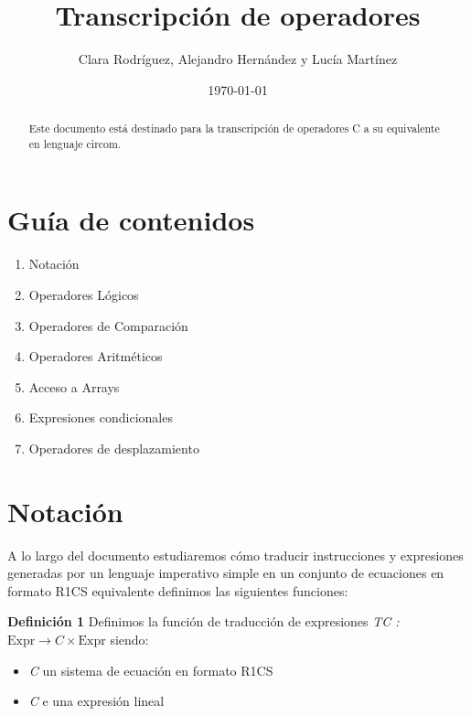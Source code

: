 \documentclass[a4paper,10pt]{article}
\begin{document}
	
	\title{Transcripción de operadores}
	\author{Clara Rodríguez, Alejandro Hernández y Lucía Martínez}
	\date{\today}  
	\maketitle 
	
	\begin{abstract}
		\begin{center}
			Este documento está destinado para la transcripción de operadores C a su equivalente en lenguaje circom.
			
		\end{center}
	\end{abstract}
	
	\section*{Guía de contenidos}
	
	\begin{enumerate}
		\item Notación
		\item Operadores Lógicos
		\item Operadores de Comparación
		\item Operadores Aritméticos
		\item Acceso a Arrays
		\item Expresiones condicionales
		\item Operadores de desplazamiento
	\end{enumerate}
	
	\section{Notación} 
	\noindent A lo largo del documento estudiaremos cómo traducir instrucciones y expresiones generadas por un lenguaje imperativo simple en un conjunto de ecuaciones en formato R1CS equivalente definimos las siguientes funciones: 
	
	\vspace{0.4cm} 
	
	\noindent \normalsize {\textbf{ Definición 1} Definimos la función de traducción de expresiones \textit{TC : $\text{Expr} \rightarrow C \times \text{Expr}$} siendo:} 
	
	\begin{itemize} 
		\item \textit C un sistema de ecuación en formato R1CS
		\item \textit C e una expresión lineal 
	\end{itemize} 
	
\end{document}
